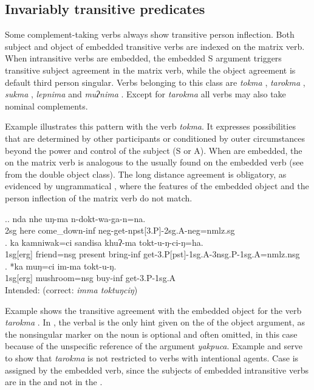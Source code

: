 \subsection{Invariably transitive predicates}

Some complement-taking verbs always show transitive person inflection. Both subject and object of embedded transitive verbs are indexed on the matrix verb. When intransitive verbs are embedded, the embedded S argument triggers transitive subject agreement in the matrix verb, while the object agreement is default third person singular. Verbs belonging to this class are  \emph{tokma} , \emph{tarokma} , \emph{sukma} ,  \emph{lepnima}  and \emph{muʔnima} . Except for \emph{tarokma} all verbs may also take nominal complements. 

\largerpage
Example \Next illustrates this pattern with the verb \emph{tokma}. It expresses possibilities that are determined by other participants or conditioned by outer circumstances beyond the power and control of the subject (S or A). When  are embedded,  the  on the matrix verb is analogous to the  usually found on  the embedded verb (see \Next[b] from the double object class). The long distance agreement is obligatory, as evidenced by ungrammatical \Next[c], where the  features of the embedded object and the person inflection of the matrix verb do not match. 

\ex.\ag. nda nhe uŋ-ma n-dokt-wa-ga-n=na.\\
{\sc 2sg} here come\_down-{\sc inf} {\sc neg}-get{\sc -npst[3.P]-2sg.A-neg=nmlz.sg}\\
 
\bg. ka kamniwak=ci sandisa  khuʔ-ma tokt-u-ŋ-ci-ŋ=ha.\\
{\sc 1sg[erg]} friend{\sc =nsg} present bring-{\sc inf} get-{\sc 3.P[pst]-1sg.A-3nsg.P-1sg.A=nmlz.nsg}\\
	\bg. *ka muŋ=ci im-ma tokt-u-ŋ.\\
		{\sc 1sg[erg]} mushroom{\sc =nsg} buy{\sc -inf} get-{\sc 3.P-1sg.A}\\
	Intended:   (correct: \emph{imma toktuŋciŋ})


Example \Next shows the transitive agreement with the embedded object for the verb \emph{tarokma} . In \Next[a], the verbal  is the only hint given on the  of the object argument, as the nonsingular marker on the noun is optional and often omitted, in this case because of  the unspecific reference of the argument \emph{yakpuca}. Example \Next[b] and \Next[c] serve to show  that \emph{tarokma} is  not restricted to verbs with intentional agents. 
Case is assigned by the embedded verb, since the subjects of embedded intransitive verbs are in the  and not in the . 



